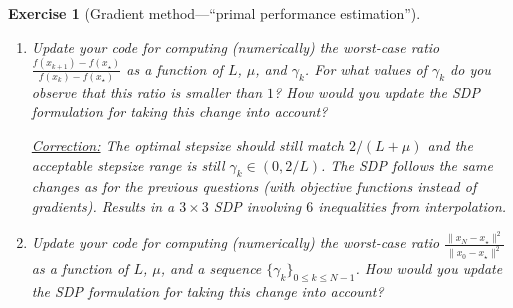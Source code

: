 \documentclass[11pt,a4paper]{article}
\newcommand{\inner}[2]{{\langle #1, #2\rangle}}
\newcommand{\correction}[1]{{{\color{blue}\underline{Correction:} #1}}}
\newcommand{\correction}[1]{}
\newtheorem{exercise}{Exercise}
\begin{document}
\begin{exercise}[Gradient method---``primal performance estimation'']
\begin{enumerate}
{\begin{equation*}
\begin{aligned}
		\text{s.t. } & \exists f\in\mathcal{F}_{\mu,L} \text{ such that }\left\{\begin{array}{ll}
			f_i=f(x_i)\quad & i=k,k+1\\
			g_i=\nabla f(x_i)\quad & i=k,k+1
			\end{array}\right.\\
		& x_{k+1}=x_k-\gamma_k  g_k\\
		& \|g_k\|^2=1,\\
		\end{aligned}
		\end{equation*}
		which can be encoded as a $2\times 2$ SDP using
			\begin{align*}
			G \triangleq \begin{bmatrix}
			\| g_k\|^2 & \inner{ g_{k+1}}{g_k}\\
			\inner{g_k}{g_{k+1}} & \|g_{k+1}\|^2
			\end{bmatrix},\quad 	F \triangleq 			f_{k+1}-f_k,
			\end{align*}
			and hence only $2$ inequalities arising from interpolation constraints.
	}
	
	\item Update your code for computing (numerically) the worst-case ratio $\frac{f(x_{k+1})-f(x_\star)}{f(x_{k})-f(x_\star)}$ as a function of $L$, $\mu$, and $\gamma_k$. For what values of $\gamma_k$ do you observe that this ratio is smaller than $1$? How would you update the SDP formulation for taking this change into account?
	
	\correction{The optimal stepsize should still match $2/(L+\mu)$ and the acceptable stepsize range is still $\gamma_k\in(0,2/L)$. The SDP follows the same changes as for the previous questions (with objective functions instead of gradients). Results in a $3\times 3$ SDP involving $6$ inequalities from interpolation.}
	
	\item Update your code for computing (numerically) the worst-case ratio $\frac{\|x_{N}-x_\star\|^2}{\|x_0-x_\star\|^2}$ as a function of $L$, $\mu$, and a sequence $\{\gamma_k\}_{0\leqslant k\leqslant N-1}$. How would you update the SDP formulation for taking this change into account?
	

\end{enumerate}
\end{exercise}
\end{document}
